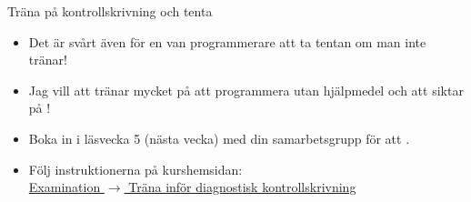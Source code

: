 \documentclass{lecturenotes}
\begin{document}
\begin{Slide}{Träna på kontrollskrivning och tenta}
\begin{itemize}
\item Det är svårt även för en van programmerare att ta tentan om man inte tränar!
\item Jag vill att  tränar mycket på att programmera utan hjälpmedel och att  siktar på !
\item Boka in  i läsvecka 5 (nästa vecka) med din samarbetsgrupp för att .
\item Följ instruktionerna på kurshemsidan: \\ \href{http://cs.lth.se/eda016/examination/}{Examination $\rightarrow$ Träna inför diagnostisk kontrollskrivning}
\end{itemize}
\end{Slide}
\end{document}
